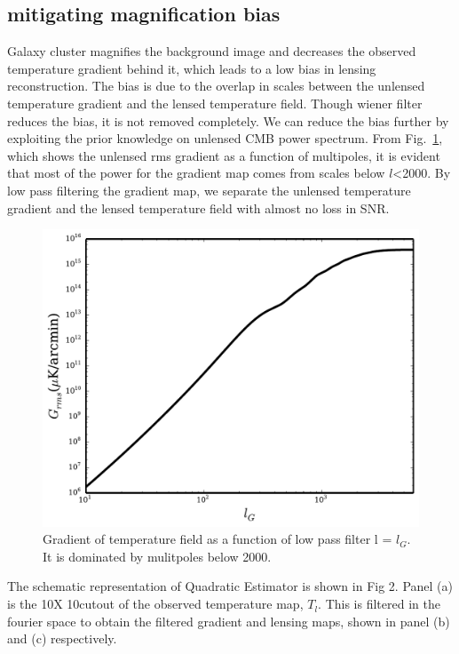   \subsection{mitigating magnification bias}
Galaxy cluster magnifies the background image and decreases the observed temperature gradient behind it, which leads to a low bias in lensing reconstruction.
The bias is due to the overlap in scales between the unlensed temperature gradient and the lensed temperature field. 
Though wiener filter reduces the bias, it is not removed completely.
We can reduce the bias further by exploiting the prior knowledge on unlensed CMB power spectrum.
 From Fig.~\ref{fig:gradient_cut}, which shows the unlensed rms gradient as a function of multipoles, it is evident that most of the power for the gradient map comes from scales below $l$<2000.
 By low pass filtering the gradient map, we separate the unlensed temperature gradient and the lensed temperature field with almost no loss in SNR.
 \begin{figure}
\includegraphics[width=\linewidth]{figs/gradient_cut.pdf}
\caption{Gradient of temperature field as a function of low pass filter l = $l_{G}$. It is dominated by mulitpoles below 2000. }
\label{fig:gradient_cut}
\end{figure}
The schematic representation of Quadratic Estimator is shown in Fig 2. 
Panel (a) is the 10\arcmin X 10\arcmin cutout of the observed temperature map, $T_{l}$.
This is filtered in the fourier space  to obtain the filtered gradient and lensing maps, shown in panel (b) and (c) respectively.
